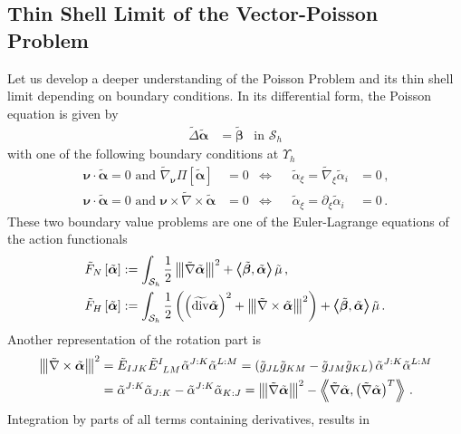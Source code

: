 \documentclass[a4paper,10pt]{scrartcl}
\newcommand{\surf}{\mathcal{S}}
\newcommand{\surfh}{\surf_{h}}
\newcommand{\nub}{\bm{\nu}}
\newcommand{\tg}{\tilde{g}}
\newcommand{\alphab}{\bm{\alpha}}
\newcommand{\betab}{\bm{\beta}}
\renewcommand{\div}{\operatorname{div}}
\newcommand{\talphab}{\tilde{\alphab}}
\newcommand{\talpha}{\tilde{\alpha}}
\newcommand{\tbetab}{\tilde{\betab}}
\newcommand{\tmu}{\tilde{\mu}}
\newcommand{\tF}{\tilde{F}}
\newcommand{\tnabla}{\tilde{\nabla}}
\newcommand{\tlaplace}{\tilde{\Delta}}
\newcommand{\tdiv}{\widetilde{\div}}
\newcommand{\tnorm}[1]{\left\Vert\mkern-1.9mu\left\vert #1 \right\vert\mkern-1.9mu\right\Vert}
\newcommand{\tscal}[1]{\left\langle\mkern-8mu\left\langle #1 \right\rangle\mkern-8mu\right\rangle}
\newcommand{\boundary}[1]{\Upsilon_{h}^{#1}}
\newcommand{\tLC}{\tilde{E}}
\newcommand{\formComma}{\,\text{,}}
\newcommand{\formPeriod}{\,\text{.}}
\begin{document}
  \subsection{Thin Shell Limit of the Vector-Poisson Problem}
    Let us develop a deeper understanding of the Poisson Problem and its thin shell limit depending on boundary conditions.
    In its differential form, the Poisson equation is given by
    \begin{align}
      \tlaplace\talphab &= \tbetab &\text{in }\surfh
    \end{align}
    with one of the following boundary conditions at \( \boundary{}\)
    \begin{align}
      \nub\cdot\talphab = 0 \text{ and } \tnabla_{\nub}\Pi\left[ \talphab \right] &= 0
        &\Leftrightarrow&& \talpha_{\xi} = \tnabla_{\xi}\talpha_{i} &= 0  \tag{NPNC}\formComma\\
      \nub\cdot\talphab = 0 \text{ and } \nub \times \tnabla \times \talphab &= 0
        &\Leftrightarrow&& \talpha_{\xi} = \partial_{\xi}\talpha_{i} &= 0 \tag{NPHC} \formPeriod
    \end{align}
    These two boundary value problems are one of the Euler-Lagrange equations of the action functionals
    \begin{align}
      \tF_{N}\left[ \talphab \right] &:= \int_{\surfh} \frac{1}{2}\tnorm{\tnabla\talphab}^{2} + \tscal{\tbetab,\talphab}\tmu \formComma\\
      \tF_{H}\left[ \talphab \right] &:= \int_{\surfh} \frac{1}{2}\left( \left( \tdiv\talphab \right)^{2} + \tnorm{\tnabla\times\talphab}^{2} \right) + \tscal{\tbetab,\talphab}\tmu\formPeriod
    \end{align}
    Another representation of the rotation part is
    \begin{align}
      \tnorm{\tnabla\times\talphab}^{2}
          &= \tLC_{IJK}\tensor{\tLC}{^{I}_{LM}} \talpha^{J:K}\talpha^{L:M}
          = \left( \tg_{JL}\tg_{KM} - \tg_{JM}\tg_{KL} \right) \talpha^{J:K}\talpha^{L:M}\\
          &=      \talpha^{J:K}\talpha_{J:K} -    \talpha^{J:K}\talpha_{K:J}  
          = \tnorm{\tnabla\talphab}^{2} - \tscal{\tnabla\talphab, \left( \tnabla\talphab \right)^{T}}\formPeriod
    \end{align}
    Integration by parts of all terms containing derivatives, results in
\end{document}
